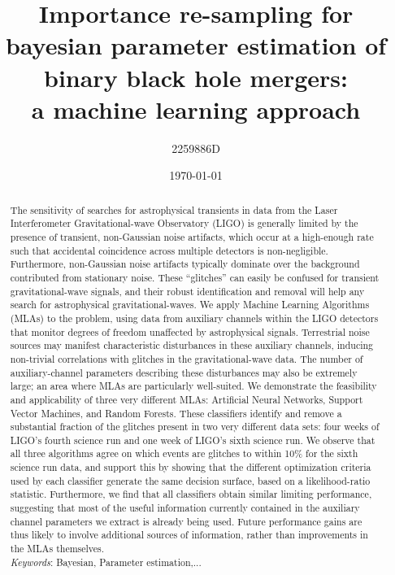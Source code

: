 \documentclass[prd, twocolumn, lengthcheck, superscriptaddress, showpacs, letterpaper, nofootinbib]{revtex4-1}
\begin{document}
\title{Importance re-sampling for bayesian parameter estimation of binary black hole mergers: \\a machine learning approach}

\author{2259886D}

\date{\today}

\begin{abstract}

The sensitivity of searches for astrophysical transients in data from the Laser
Interferometer Gravitational-wave Observatory (LIGO) is generally limited by
the presence of transient, non-Gaussian noise artifacts, which occur at a
high-enough rate such that accidental coincidence across multiple detectors is
non-negligible. Furthermore, non-Gaussian noise artifacts typically dominate over the background contributed from stationary
noise. These ``glitches'' can easily be confused for transient gravitational-wave
signals, and their robust identification and removal will help any search for
astrophysical gravitational-waves. We apply Machine Learning Algorithms (MLAs)
to the problem, using data from auxiliary channels within the LIGO detectors
that monitor degrees of freedom unaffected by astrophysical signals.
Terrestrial noise sources may manifest characteristic disturbances in these
auxiliary channels, inducing non-trivial correlations with glitches in the
gravitational-wave data.  The number of auxiliary-channel parameters describing these
disturbances may also be extremely large; an area where MLAs are particularly
well-suited.  We demonstrate the feasibility and applicability of three very
different MLAs: Artificial Neural Networks, Support Vector Machines, and
Random Forests. These classifiers identify and remove a substantial fraction of
the glitches present in two very different data sets: four weeks of LIGO's
fourth science run and one week of LIGO's sixth science run. We observe that
all three algorithms agree on which events are glitches to within 10\% for the 
sixth science run data, and support this by showing that
the different optimization criteria used by each classifier generate the same
decision surface, based on a likelihood-ratio statistic.  Furthermore, we find
that all classifiers obtain similar limiting performance, suggesting that most
of the useful information currently contained in the auxiliary channel parameters we
extract is already being used.  Future performance gains are thus likely to
involve additional sources of information, rather than improvements in the
MLAs themselves.
\\\textit{Keywords}: Bayesian, Parameter estimation,...

\end{abstract}
\end{document}
